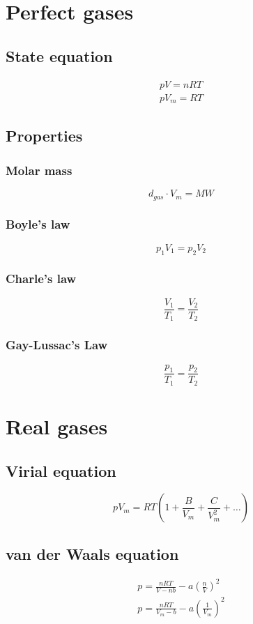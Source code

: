 \documentclass[a4paper]{report}
\begin{document}
  \begin{multicols}{2}

    \section{Perfect gases}
        \subsection{State equation}
      \begin{gather*}
        pV = nRT\\
        pV_{m} = RT
      \end{gather*}
        \subsection{Properties}
        \subsubsection{Molar mass}  
         $$ d_{gas} \cdot V_{m} = MW $$
        \subsubsection{Boyle's law}
        $$ p_1 V_1 = p_2 V_2 $$
        \subsubsection{Charle's law}
        $$ \frac{V_1}{T_1} = \frac{V_2}{T_2} $$
        \subsubsection{Gay-Lussac's Law}
        $$ \frac{p_1}{T_1} = \frac{p_2}{T_2} $$

    \section{Real gases}
        \subsection{Virial equation}

        \[
        pV_{m}=RT\left( 1+\frac{B}{V_{m}}+\frac{C}{V^{2}_{m}}+\dots \right) 
        \] 

        \subsection{van der Waals equation}
        \begin{gather*}
          p = \frac{nRT}{V-nb} - a \left(\frac{n}{V} \right) ^{2}  \\
          p = \frac{nRT}{V_{m} - b } - a \left(\frac{1}{V_{m} }  \right)^{2} 
        \end{gather*}


\end{multicols}
\end{document}

